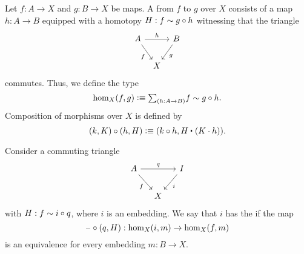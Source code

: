 \begin{defn}
  Let $f:A\to X$ and $g:B\to X$ be maps. A  from $f$ to $g$ over $X$ consists of a map $h:A\to B$ equipped with a homotopy $H:f\sim g\circ h$ witnessing that the triangle
\begin{equation*}
\begin{tikzcd}[column sep=tiny]
A \arrow[rr,"h"] \arrow[dr,swap,"f"] & & B \arrow[dl,"g"] \\
& X
\end{tikzcd}
\end{equation*}
commutes. Thus, we define the type
\begin{equation*}
\mathrm{hom}_X(f,g)\defeq\sm{h:A\to B}f\htpy g\circ h.
\end{equation*}
Composition of morphisms over $X$ is defined by
\begin{equation*}
  (k,K)\circ (h,H) \defeq (k\circ h,\ct{H}{(K\cdot h)}).
\end{equation*}
\end{defn}

\begin{defn}
Consider a commuting triangle
\begin{equation*}
\begin{tikzcd}[column sep=small]
A \arrow[rr,"q"] \arrow[dr,swap,"f"] & & I \arrow[dl,"i"] \\
& X
\end{tikzcd}
\end{equation*}
with $H:f\sim i\circ q$, where $i$ is an embedding.
We say that $i$ has the  if the map
\begin{equation*}
\mathord{\hspace{1pt}\text{--}\hspace{1pt}}\circ(q,H) : \mathrm{hom}_X(i,m)\to\mathrm{hom}_X(f,m)
\end{equation*}
is an equivalence for every embedding $m:B\to X$. 
\end{defn}


